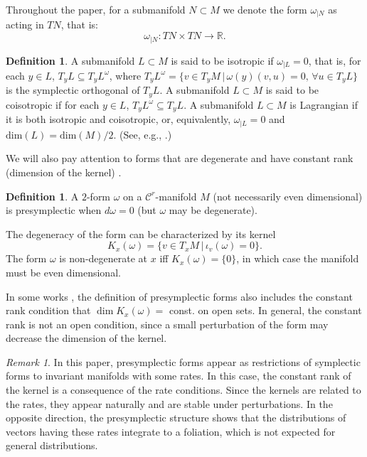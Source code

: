 \documentclass[11pt]{amsart}
\theoremstyle{definition}
\newtheorem{defn}[thm]{Definition}
\theoremstyle{remark}
\newtheorem{rem}[thm]{Remark}
\numberwithin{equation}{section}
\newcommand{\R}{\mathbb R}
\newcommand{\C}{\mathcal{C}}
\begin{document}
Throughout the paper, for  a submanifold  $N \subset M$ we denote the form
$\omega _{\mid N}$ as acting in $TN$, that is:
\[
\omega_{\mid N}: TN\times TN \to \R.
\]



\begin{defn}\label{defn:isotropic }
A submanifold $L\subset M$ is said to be  isotropic if $\omega_{\mid L} = 0$,
that is, for each $y\in L$, $T_yL\subseteq T_yL^\omega$,
where
$T_yL^\omega=\{v\in T_yM\,|\, \omega(y)(v,u)=0,\, \forall u\in T_yL\}$ is the symplectic orthogonal of $T_yL$.
A submanifold $L\subset M$ is said to be  coisotropic if  for each $y\in L$, $T_yL^\omega\subseteq T_yL$.
A  submanifold $L \subset M$  is Lagrangian if it is both isotropic and coisotropic, or, equivalently,
 $\omega_{\mid L} = 0$ and
$\textrm{dim}(L) = \textrm{dim}(M)/2$. (See, e.g., \cite{Weinstein71,Weinstein73}.)
\end{defn}

We will also pay attention to forms
that are degenerate and have constant rank (dimension of the kernel)
\cite{Souriau97}.

\begin{defn}\label{defn:presymplectic}
  A $2$-form  $\omega$ on a $\C^r$-manifold $M$ (not necessarily even dimensional)  is presymplectic when
   $d\omega  = 0$ (but $\omega$ may be degenerate).
\end{defn}

The degeneracy of the form can be characterized by its
kernel
\[
K_x(\omega)  = \{v \in T_x M \,| \,  \iota_v(\omega) =0\}.
\]
The form $\omega$ is non-degenerate at $x$ iff $K_x(\omega)  = \{0\}$, in which case the manifold must be even dimensional.

In some works \cite{Souriau97,LibermannM87},  the definition of presymplectic forms  also includes the constant rank condition that $\dim K_x(\omega)=$ const. on open sets.
In general,  the constant rank is not an open condition, since a  small perturbation of the form may decrease the dimension of the kernel.

\begin{rem}
In this paper,  presymplectic forms appear as restrictions of
symplectic forms to invariant manifolds with some rates.
In this case, the constant rank of the kernel
is a consequence of the rate conditions.
Since the kernels are related to the rates, they appear naturally
and are stable under perturbations.
In the opposite direction,  the presymplectic structure
shows that the distributions of vectors having these rates
integrate to a foliation, which is not expected for general distributions.
\end{rem}
\end{document}
